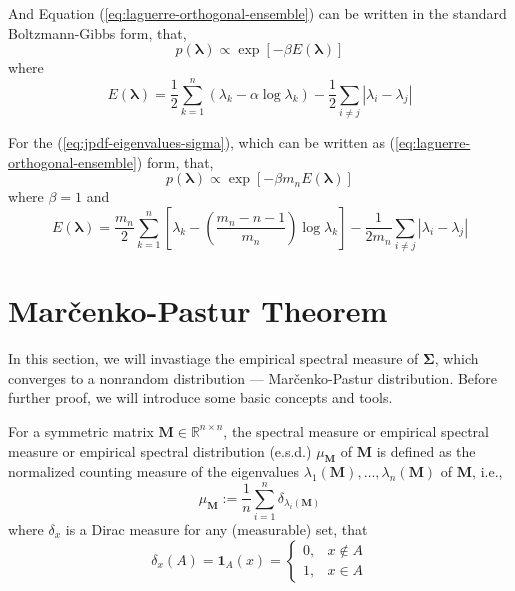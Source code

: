 And Equation (\ref{eq:laguerre-orthogonal-ensemble}) can be written in the standard Boltzmann-Gibbs form, that,
\begin{equation*}
    p\left(\boldsymbol{\lambda}\right)\propto\exp\left[-\beta E\left(\boldsymbol{\lambda}\right)\right]
\end{equation*}
where
\begin{equation}
    E\left(\boldsymbol{\lambda}\right)=\frac{1}{2}\sum_{k=1}^{n}\left(\lambda_{k}-\alpha\log\lambda_{k}\right)-\frac{1}{2}\sum_{i\neq j}\left|\lambda_{i}-\lambda_{j}\right|
\end{equation}

\begin{remark}
    For the (\ref{eq:jpdf-eigenvalues-sigma}), which can be written as (\ref{eq:laguerre-orthogonal-ensemble}) form, that,
    \begin{equation*}
        p\left(\boldsymbol{\lambda}\right)\propto\exp\left[-\beta m_{n}E\left(\boldsymbol{\lambda}\right)\right]
    \end{equation*}
    where $\beta=1$ and
    \begin{equation*}
        E\left(\boldsymbol{\lambda}\right)=\frac{m_{n}}{2}\sum_{k=1}^{n}\left[\lambda_{k}-\left(\frac{m_{n}-n-1}{m_{n}}\right)\log\lambda_{k}\right]-\frac{1}{2m_{n}}\sum_{i\neq j}\left|\lambda_{i}-\lambda_{j}\right|
    \end{equation*}
\end{remark}

\section{Marčenko-Pastur Theorem}

In this section, we will invastiage the empirical spectral measure of $\boldsymbol{\Sigma}$, which converges to a nonrandom distribution --- Marčenko-Pastur distribution. Before further proof, we will introduce some basic concepts and tools.

\begin{definition}
    For a symmetric matrix $\mathbf{M}\in\mathbb{R}^{n\times n}$, the spectral measure or empirical spectral measure or empirical spectral distribution (e.s.d.) $\mu_{\mathbf{M}}$ of $\mathbf{M}$ is defined as the normalized counting measure of the eigenvalues $\lambda_{1}(\mathbf{M}),\ldots,\lambda_{n}(\mathbf{M})$ of $\mathbf{M}$, i.e.,
    \begin{equation}
        \mu_{\mathbf{M}}:=\frac{1}{n}\sum_{i=1}^{n}\delta_{\lambda_{i}(\mathbf{M})}
    \end{equation}
    where $\delta_{x}$ is a Dirac measure for any (measurable) set, that
    \begin{equation*}
        \delta_{x}(A)=\mathbf{1}_{A}(x)=
        \begin{cases}
            0, & x\notin A \\
            1, & x\in A
        \end{cases}
    \end{equation*}
\end{definition}

